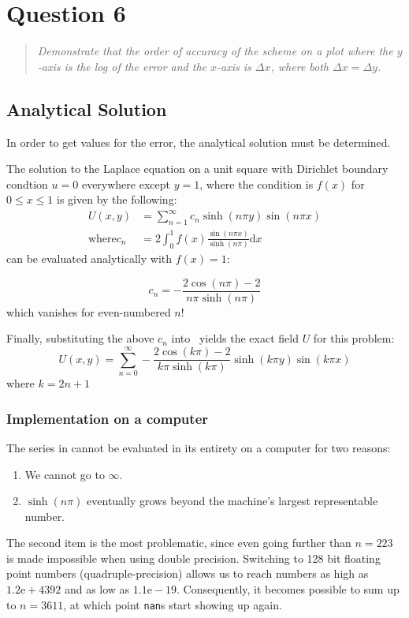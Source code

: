 \documentclass{SelimArticle}
\begin{document}
\newpage
\section{Question 6}
\begin{quote}
    \textit{Demonstrate that the order of accuracy of the scheme on a plot where the $y$-axis is the
log of the error and the $x$-axis is $\Delta x$, where both $\Delta x = \Delta y$.}
\end{quote}
\subsection{Analytical Solution}
In order to get values for the error, the analytical solution must be determined.

The solution to the Laplace equation on a unit square with Dirichlet boundary condtion $u = 0$ everywhere
except $y = 1$, where the condition is $f(x)$ for $0 \le x \le 1$ is given by the following:
\begin{align}
    \label{eq:uexg}
    U(x,y) &= \sum_{n=1}^\infty c_n \sinh(n \pi y) \sin(n \pi x)\\
    \label{eq:cg}
    \text{where} c_n &= 2 \int_0^1 f(x)\frac{\sin(n \pi x)}{\sinh(n\pi)} \text{d}x
\end{align}
 can be evaluated analytically with $f(x) = 1$:
\newcommand{\csol}[1]{- \frac{2\cos(#1 \pi) - 2}{#1 \pi \sinh(#1 \pi)}}

\begin{equation}
    \label{eq:c}
    c_n = \csol{n}
\end{equation}
which vanishes for even-numbered $n$!

Finally, substituting the above $c_n$ into~ yields the exact field $U$ for this problem:
\begin{equation}
    \label{eq:uex}
    U(x,y) = \sum_{n=0}^\infty \csol{k}\sinh(k \pi y) \sin(k \pi x)
\end{equation}
where $k = 2n + 1$

\subsubsection{Implementation on a computer}
The series in  cannot be evaluated in its entirety on a computer for two reasons:
\begin{enumerate}[noitemsep]
    \item We cannot go to $\infty$.
    \item $\sinh(n\pi)$ eventually grows beyond the machine's largest representable number.
\end{enumerate}
The second item is the most problematic, since even going further than $n=223$ is made impossible when
using double precision.
Switching to 128 bit floating point numbers (quadruple-precision) allows us to reach
numbers as high as $1.2\text{e}+4392$ and as low as $1.1\text{e}-19$. Consequently, it becomes possible to sum
up to $n = 3611$, at which point \texttt{nan}s start showing up again.
\end{document}
